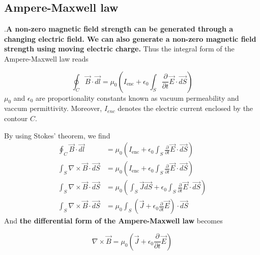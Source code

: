 \subsection{Ampere-Maxwell law}
.\textbf{A non-zero magnetic field strength can be generated through
a changing electric field. We can also generate a non-zero magnetic field strength using moving electric charge.} Thus the integral form of the Ampere-Maxwell law reads
\begin{qt}
    \begin{equation}
\oint_{C} \vec{B} \cdot \overrightarrow{d l}=\mu_{0}\left(I_{\mathrm{enc}}+\epsilon_{0} \int_{S} \frac{\partial}{\partial t} \vec{E} \cdot \overrightarrow{d S}\right)
\end{equation}
$\mu_{0}$ and $\epsilon_{0}$ are proportionality constants known as vacuum permeability and vaccum permittivity. Moreover, $I_{enc}$ denotes the electric current enclosed by the contour $C$.
\end{qt}
By using Stokes' theorem, we find
$$
\begin{aligned}
\oint_{C} \vec{B} \cdot \overrightarrow{d l} &=\mu_{0}\left(I_{\mathrm{enc}}+\epsilon_{0} \int_{S} \frac{\partial}{\partial t} \vec{E} \cdot \overrightarrow{d S}\right) \\
\int_{S} \nabla \times \vec{B} \cdot \overrightarrow{d S} &=\mu_{0}\left(I_{\mathrm{enc}}+\epsilon_{0} \int_{S} \frac{\partial}{\partial t} \vec{E} \cdot \overrightarrow{d S}\right) \\
\int_{S} \nabla \times \vec{B} \cdot \overrightarrow{d S} &=\mu_{0}\left(\int_{S} \overrightarrow{J} \overrightarrow{d S}+\epsilon_{0} \int_{S} \frac{\partial}{\partial t} \vec{E} \cdot \overrightarrow{d S}\right) \\
\int_{S} \nabla \times \vec{B} \cdot \overrightarrow{d S} &=\mu_{0} \int_{S}\left(\vec{J}+\epsilon_{0} \frac{\partial}{\partial t} \vec{E}\right) \cdot \overrightarrow{d S}
\end{aligned}
$$
And \textbf{the differential form of the Ampere-Maxwell law} becomes
\begin{qt}
\begin{equation}
\nabla \times \vec{B}=\mu_{0}\left(\vec{J}+\epsilon_{0} \frac{\partial}{\partial t} \vec{E}\right)
\end{equation}
\end{qt}

